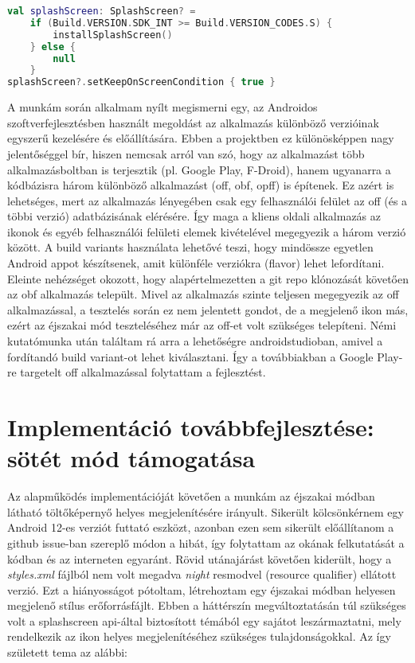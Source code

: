 \begin{lstlisting}[frame=single, language=Kotlin, caption=A \gls{splashscreen} compat könyvtár
    segítségével visszafele kompatibilitást támogató kódrészlet]
val splashScreen: SplashScreen? =
    if (Build.VERSION.SDK_INT >= Build.VERSION_CODES.S) {
        installSplashScreen()
    } else {
        null
    }
splashScreen?.setKeepOnScreenCondition { true }
\end{lstlisting}


A munkám során alkalmam nyílt megismerni egy, az Androidos szoftverfejlesztésben használt
megoldást az alkalmazás különböző verzióinak egyszerű kezelésére és előállítására. Ebben a projektben ez
különösképpen nagy jelentőséggel bír, hiszen nemcsak arról van szó, hogy az alkalmazást több
alkalmazásboltban is terjesztik (pl. Google Play, F-Droid), hanem ugyanarra a kódbázisra
három különböző alkalmazást (\acrfull{off}, \acrfull{obf}, \acrfull{opff})
is építenek. Ez azért is lehetséges, mert az alkalmazás lényegében csak egy felhasználói felület
az \acrlong{off} (és a többi verzió) adatbázisának elérésére. Így maga a kliens oldali alkalmazás
az ikonok és egyéb felhasználói felületi elemek kivételével megegyezik a három verzió között.
A build variants használata lehetővé teszi, hogy mindössze egyetlen Android appot
készítsenek, amit különféle verziókra (flavor) lehet lefordítani. Eleinte nehézséget okozott,
hogy alapértelmezetten a \Gls{git} \gls{repo} klónozását követően az \acrlong{obf} alkalmazás
települt. Mivel az alkalmazás szinte teljesen megegyezik az \acrlong{off} alkalmazással, a
tesztelés során ez nem jelentett gondot, de a  megjelenő ikon más, ezért az éjszakai
mód teszteléséhez már az \acrlong{off}-et volt szükséges telepíteni. Némi kutatómunka után
találtam rá arra a lehetőségre \gls{androidstudio}ban, amivel a fordítandó build variant-ot lehet
kiválasztani. Így a továbbiakban a Google Play-re targetelt \acrlong{off} alkalmazással
folytattam a fejlesztést.

\section{Implementáció továbbfejlesztése: sötét mód támogatása}
Az alapműködés implementációját követően a munkám az éjszakai módban látható töltőképernyő helyes megjelenítésére irányult.
Sikerült kölcsönkérnem egy Android 12-es verziót futtató eszközt, azonban ezen sem sikerült
előállítanom a \gls{github} issue-ban \cite{issue} szereplő módon a hibát, így folytattam az okának felkutatását
a kódban és az interneten egyaránt. Rövid utánajárást követően kiderült, hogy a
\textit{styles.xml} fájlból nem volt megadva \textit{night} \gls{resmod}vel
(resource qualifier) ellátott verzió. Ezt a hiányosságot pótoltam, létrehoztam egy éjszakai
módban helyesen megjelenő stílus erőforrásfájlt. Ebben a háttérszín megváltoztatásán túl szükséges
volt a \gls{splashscreen} \acrshort{api}-által biztosított témából egy sajátot leszármaztatni, mely rendelkezik
az ikon helyes megjelenítéséhez szükséges tulajdonságokkal. Az így született \gls{tema} az alábbi:

